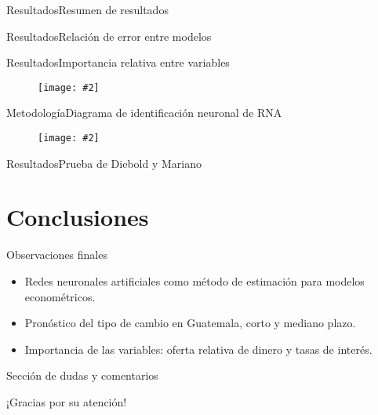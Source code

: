 \documentclass{beamer}
\newcommand{\figura}[2]{
	\begin{figure}
		\centering
		\texttt{[image: \#2]}
	\end{figure}	
}
\newcommand{\diapositivatexto}[2]{
\begin{frame}{#1}
	\huge\centerline{#2}
\end{frame}
}
\begin{document}
\begin{frame}{Resultados}{Resumen de resultados}
	
\end{frame}

\begin{frame}{Resultados}{Relación de error entre modelos}
	
\end{frame}

\begin{frame}{Resultados}{Importancia relativa entre variables}
	\figura{0.65}{figuras/garson_19.pdf}
\end{frame}

\begin{frame}{Metodología}{Diagrama de identificación neuronal de RNA}
\figura{1}{figuras/plotnet_19.pdf}
\end{frame}

\begin{frame}{Resultados}{Prueba de Diebold y Mariano}
	{\scriptsize
	}
\end{frame}


\section{Conclusiones}

\begin{frame}{Observaciones finales}
	\begin{itemize}
		\item Redes neuronales artificiales como método de estimación para modelos econométricos.
		
		\item Pronóstico del tipo de cambio en Guatemala, corto y mediano plazo.
		
		\item Importancia de las variables: oferta relativa de dinero y tasas de interés.
	\end{itemize}
\end{frame}

\begin{comment}
\begin{frame}{¡Gracias por su atención!}{Sección de dudas}
\figura{0.5}{figuras/philosoraptor.jpg}
\end{frame}
\end{comment}

\diapositivatexto{Sección de dudas y comentarios}{¡Gracias por su atención!}
\end{document}
